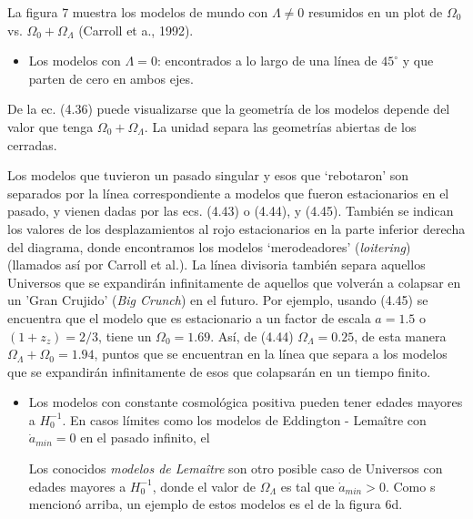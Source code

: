 \documentclass[11pt]{article}
\begin{document}
    La figura 7 muestra los modelos de mundo con $\Lambda \neq 0$  resumidos en un plot de $\Omega_0$  vs. $\Omega_0 + \Omega_{\Lambda}$ (Carroll et a., 1992). 
    
    \begin{itemize}
        \item Los modelos con $\Lambda=0$: encontrados a lo largo de una línea de $45^{\circ}$ y que parten de cero en ambos ejes. 
    \end{itemize}
    
    De la ec. (4.36) puede visualizarse que la geometría de los modelos depende del valor que tenga $\Omega_0 +  \Omega_{\Lambda}$. La unidad separa las geometrías abiertas de los cerradas. 
    
    Los modelos que tuvieron un pasado singular y esos que `rebotaron' son separados por la línea correspondiente a modelos que fueron estacionarios en el pasado, y vienen dadas por las ecs. (4.43) o (4.44), y (4.45). También se indican los valores de los desplazamientos al rojo estacionarios en la parte inferior derecha del diagrama, donde encontramos los modelos `merodeadores' ({\textit{loitering}}) (llamados así por Carroll et al.). La línea divisoria también separa aquellos Universos que se expandirán infinitamente de aquellos que volverán a colapsar en un 'Gran Crujido' ({\textit{Big Crunch}}) en el futuro. Por ejemplo, usando (4.45) se encuentra que el modelo que es estacionario a un factor de escala $a=1.5$ o $(1+z_z)=2/3$, tiene un $\Omega_0=1.69$. Así, de (4.44) $\Omega_{\Lambda} =0.25$, de esta manera $\Omega_{\Lambda} + \Omega_0 = 1.94$, puntos que se encuentran en la línea que separa a los modelos que se expandirán infinitamente de esos que colapsarán en un tiempo finito. 
    
    
    \begin{itemize}
        \item Los modelos con constante cosmológica positiva pueden tener edades mayores a $H_0^{-1}$. En casos límites como los modelos de Eddington - Lema\^itre con $\dot{a}_{min}=0$ en el pasado infinito, el 
        
       Los conocidos {\textit{modelos de Lema\^itre}} son otro posible caso de Universos con edades mayores a $H_0^{-1}$, donde el valor de $\Omega_{\Lambda}$ es tal que $\dot{a}_{min} >0$. Como s mencionó arriba, un ejemplo de estos modelos es el de la figura 6d. 
    \end{itemize}
    
\end{document}
